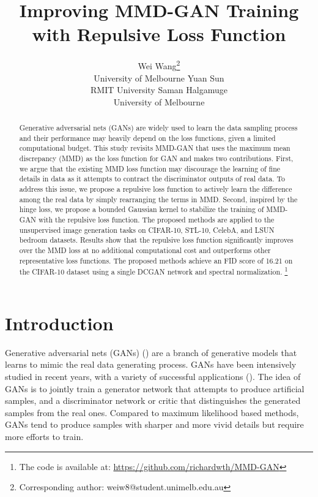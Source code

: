 \documentclass{article} %
\title{Improving MMD-GAN Training with Repulsive Loss Function}
\author{Wei Wang\thanks{Corresponding author: weiw8@student.unimelb.edu.au} 
\\
University of Melbourne
\And
Yuan Sun \\
RMIT University
\And
Saman Halgamuge \\
University of Melbourne
}
\theoremstyle{plain}
\newtheorem*{proposition 1*}{Proposition 1}
\begin{document}
\maketitle

\begin{abstract}
Generative adversarial nets (GANs) are widely used to learn the data sampling process and their performance may heavily depend on the loss functions, given a limited computational budget. This study revisits MMD-GAN that uses the maximum mean discrepancy (MMD) as the loss function for GAN and makes two contributions. First, we argue that the existing MMD loss function may discourage the learning of fine details in data as it attempts to contract the discriminator outputs of real data. To address this issue, we propose a repulsive loss function to actively learn the difference among the real data by simply rearranging the terms in MMD. Second, inspired by the hinge loss, we propose a bounded Gaussian kernel to stabilize the training of MMD-GAN with the repulsive loss function. The proposed methods are applied to the unsupervised image generation tasks on CIFAR-10, STL-10, CelebA, and LSUN bedroom datasets. Results show that the repulsive loss function significantly improves over the MMD loss at no additional computational cost and outperforms other representative loss functions. The proposed methods achieve an FID score of 16.21 on the CIFAR-10 dataset using a single DCGAN network and spectral normalization. \footnote{The code is available at: \url{https://github.com/richardwth/MMD-GAN}}
\end{abstract}

\section{Introduction}
\label{sec:intro}

Generative adversarial nets (GANs) (\cite{gan}) are a branch of generative models that learns to mimic the real data generating process. GANs have been intensively studied in recent years, with a variety of successful applications (\cite{pggan,nlpgan,semigan,cyclegan,reinforce_gan}). The idea of GANs is to jointly train a generator network that attempts to produce artificial samples, and a discriminator network or critic that distinguishes the generated samples from the real ones. Compared to maximum likelihood based methods, GANs tend to produce samples with sharper and more vivid details but require more efforts to train. 
\end{document}
